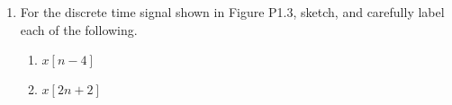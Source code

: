 \begin{enumerate}
\begin{enumerate}
          $$E_{\infty}=\lim_{T\to\infty}\int_{-T}^T(2+2\cos(t))^2\,dt$$
          $$P_{\infty}=\infty$$
          $$\therefore\text{ Energy is infinite}$$

          \begin{center}
            $$\boxed{\text{Since power is finite and energy is infinite, this is a power signal}}$$
          \end{center}

        \item $x_3[n]=\left\{\begin{array}{l r} (.5)^n,\, & n\geq0\\ 0,\, & \text{Otherwise}\end{array}$

            $$E_{\infty}=\lim_{N\to\infty}\sum_{n=0}^N \left( .25 \right)^n$$
            \begin{center}
              A geometric series must be finite:
            \end{center}
            $$E_{\infty}\approx \left( \frac{1}{1-.25} \right)\approx \frac{4}{3}$$

            $$P_{\infty}=\lim_{N\to\infty}\frac{4/3}{2N+1}\approx 0$$

            \begin{center}
              $\boxed{\text{As such, because energy is finite and average power is 0, this is an energy signal}}$
            \end{center}

    \end{enumerate}

  \item For the discrete time signal shown in Figure P1.3, sketch, and carefully label each of the following.

    \begin{enumerate}

      \item $x[n-4]$

        \begin{figure}[H]
          \centering
          
          \label{fig:8}
        \end{figure}

      \item $x[2n+2]$

        \begin{figure}[H]
          \centering
          
          \label{fig:9}
        \end{figure}


\end{enumerate}
\end{enumerate}
